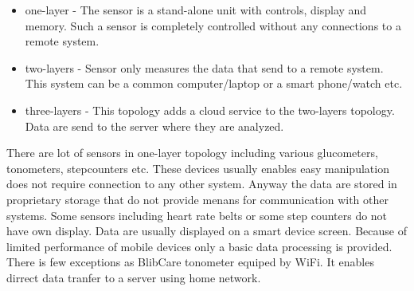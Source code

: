 \documentclass[a4paper,twoside]{article}
\begin{document}
\begin{itemize}
 \item one-layer - The sensor is a stand-alone unit with controls, display and memory. Such a sensor is completely controlled without any connections to a remote system.   
 \item two-layers - Sensor only measures the data that send to a remote system. This system can be a common computer/laptop or a smart phone/watch etc. 
 \item three-layers - This topology adds a cloud service to the two-layers topology. Data are send to the server where they are analyzed. 
\end{itemize}

There are lot of sensors in one-layer topology including various glucometers, tonometers, stepcounters etc. These devices usually enables easy manipulation does not require connection to any other system. Anyway the data are stored in proprietary storage that do not provide menans for communication with other systems. Some sensors including heart rate belts or some step counters do not have own display. Data are usually displayed on a smart device screen. Because of limited performance of mobile devices only a basic data processing is provided. There is few exceptions as BlibCare tonometer equiped by WiFi. It enables dirrect data tranfer to a server using home network. 
\end{document}
